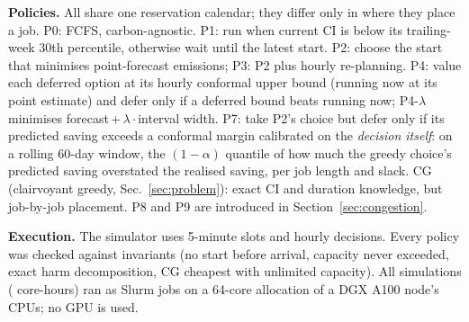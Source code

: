 \textbf{Policies.} All share one reservation calendar; they differ only in where they place a job.
P0: FCFS, carbon-agnostic.
P1: run when current CI is below its trailing-week 30th percentile, otherwise wait until the latest start.
P2: choose the start that minimises point-forecast emissions; P3: P2 plus hourly re-planning.
P4: value each deferred option at its hourly conformal upper bound (running now at its point
estimate) and defer only if a deferred bound beats running now; P4-$\lambda$ minimises
forecast\,+\,$\lambda\cdot$interval width.
P7: take P2's choice but defer only if its predicted saving exceeds a conformal margin
calibrated on the \emph{decision itself}: on a rolling 60-day window, the $(1-\alpha)$ quantile of
how much the greedy choice's predicted saving overstated the realised saving, per job length and slack.
CG (clairvoyant greedy, Sec.~\ref{sec:problem}): exact CI and duration knowledge, but job-by-job placement.
P8 and P9 are introduced in Section~\ref{sec:congestion}.

\textbf{Execution.} The simulator uses 5-minute slots and hourly decisions. Every policy was
checked against invariants (no start before arrival, capacity never exceeded, exact
harm decomposition, CG cheapest with unlimited capacity). All 
simulations ( core-hours) ran as Slurm jobs on a 64-core allocation of
a DGX A100 node's CPUs; no GPU is used.
